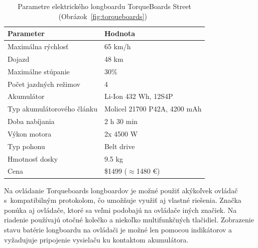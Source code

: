 \begin{table}[h]
    \centering
    \begin{tabular}{|l|l|}
        \hline
        \textbf{Parameter} & \textbf{Hodnota} \\ \hline
        Maximálna rýchlosť & 65 km/h \\ \hline
        Dojazd & 48 km \\ \hline
        Maximálne stúpanie & 30\% \\ \hline
        Počet jazdných režimov & 4 \\ \hline
        Akumulátor & Li-Ion 432 Wh, 12S4P \\ \hline
        Typ akumulátorového článku & Molicel 21700 P42A, 4200 mAh \\ \hline
        Doba nabíjania & 2 h 30 min \\ \hline
        Výkon motora & 2x 4500 W \\ \hline
        Typ pohonu & Belt drive \\ \hline
        Hmotnosť dosky & 9.5 kg \\ \hline
        Cena & \$1499 ($\approx$1480 €) \\ \hline
    \end{tabular}
    \caption{Parametre elektrického longboardu TorqueBoards Street (Obrázok~\ref{fig:torqueboards})~\cite{TorqueBoards}}\label{tab:torqueboards}
\end{table}

Na ovládanie Torqueboards longboardov je možné použiť akýkoľvek ovládač s~kompatibilným protokolom, čo umožňuje využiť aj vlastné riešenia.
Značka ponúka aj ovládače, ktoré sa veľmi podobajú na ovládače iných značiek.
Na riadenie používajú otočné kolečko a niekoľko multifunkčných tlačidiel.
Zobrazenie stavu batérie longboardu na ovládači je možné len pomocou indikátorov a vyžadujuje pripojenie vysielaču ku kontaktom akumulátora. 

